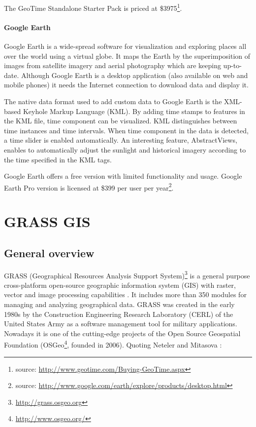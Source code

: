 \documentclass[a4paper,12pt,oneside]{book}
\begin{document}
The GeoTime Standalone Starter Pack is priced at \$3975\footnote{source:
\url{http://www.geotime.com/Buying-GeoTime.aspx}}.



\subsubsection{Google Earth}
Google Earth is a wide-spread software for visualization and exploring places all over the world
using a virtual globe.  It maps the Earth by the superimposition of images
 from satellite imagery and aerial photography which are keeping up-to-date.
Although Google Earth is a desktop application (also available on web and mobile phones) it needs
the Internet connection to download data and display it.

The native data format used to add custom data to Google Earth is the XML-based Keyhole Markup Language (KML).
By adding time stamps to features in the KML file, time component can be visualized. KML distinguishes
between time instances and time intervals. When time component in the data is detected,
a time slider is enabled automatically. An interesting feature, AbstractViews, enables to automatically
adjust the sunlight and historical imagery according to the time specified in the KML tags.

Google Earth offers a free version with limited functionality and usage.
Google Earth Pro version is licensed at \$399 per user per
year\footnote{source: \url{http://www.google.com/earth/explore/products/desktop.html}}.




\chapter{GRASS GIS}
\label{chap:grass}
\section{General overview}
GRASS  (Geographical Resources Analysis Support System)\footnote{\url{http://grass.osgeo.org}}
is a general purpose cross-platform open-source geographic information system (GIS)
with raster, vector and image processing capabilities \cite{neteler2011grass}.
It includes more than 350 modules for managing and analyzing geographical data.
GRASS was created in the early 1980s by the Construction Engineering Research Laboratory (CERL)
of the United States Army as a software management tool for military applications.
Nowadays it is one of the cutting-edge projects of the Open Source Geospatial Foundation
(OSGeo\footnote{\url{http://www.osgeo.org/}}, founded in 2006).
Quoting Neteler and Mitasova \cite[p.~3]{grassGisApproach}:
\end{document}
